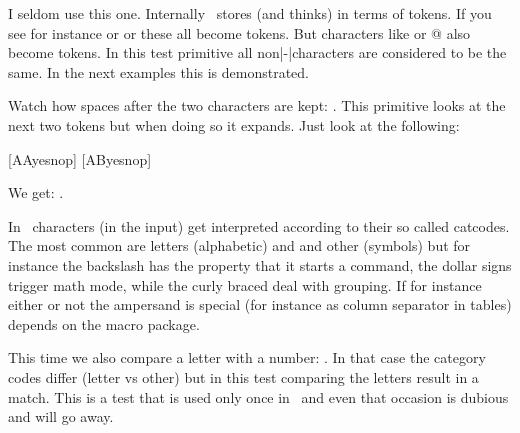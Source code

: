 \stopsectionlevel

\stopsectionlevel

\startsectionlevel[title={\TEX\ primitives}]

\startsectionlevel[title={\tex{if}}]

I seldom use this one. Internally \TEX\ stores (and thinks) in terms of tokens.
If you see for instance \type {\def} or \type {\dimen} or \type {\hbox} these all
become tokens. But characters like  or {@} also become tokens. In this
test primitive all non|-|characters are considered to be the same. In the next
examples this is demonstrated.

\stopbuffer

\typebuffer[option=TEX]

Watch how spaces after the two characters are kept: \inlinebuffer . This primitive looks
at the next two tokens but when doing so it expands. Just look at the following:

\startbuffer
\def\AA{AA}%
\def\AB{AB}%
[\if\AA yes\else nop\fi]
[\if\AB yes\else nop\fi]
\stopbuffer

\typebuffer[option=TEX]

We get: \inlinebuffer .


\stopsectionlevel

\startsectionlevel[title={\tex{ifcat}}]

In \TEX\ characters (in the input) get interpreted according to their so called
catcodes. The most common are letters (alphabetic) and and other (symbols) but
for instance the backslash has the property that it starts a command, the dollar
signs trigger math mode, while the curly braced deal with grouping. If for
instance either or not the ampersand is special (for instance as column separator
in tables) depends on the macro package.

\stopbuffer

\typebuffer[option=TEX]

This time we also compare a letter with a number: \inlinebuffer . In that case
the category codes differ (letter vs other) but in this test comparing the
letters result in a match. This is a test that is used only once in \CONTEXT\ and
even that occasion is dubious and will go away.

